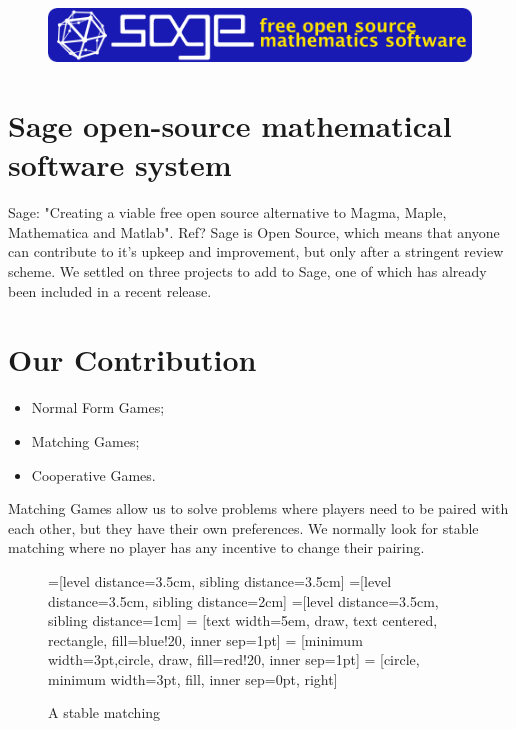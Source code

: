 \documentclass[a0,landscape]{a0poster}
\begin{document}
\vspace{1cm}
\begin{multicols}{3}


\begin{figure}[H]
\centering
\includegraphics[width=0.9\linewidth]{Images/sage-banner-02.png}
\end{figure}

\color{Brown}
\section*{Sage open-source mathematical software system}
Sage: "Creating a viable free open source alternative to Magma, Maple, Mathematica and Matlab".
Ref?
Sage is Open Source, which means that anyone can contribute to it's upkeep and improvement, but only after a stringent review scheme.
We settled on three projects to add to Sage, one of which has already been included in a recent release.

\section*{Our Contribution}
\begin{itemize}
    \item Normal Form Games;
    \item Matching Games;
    \item Cooperative Games.
\end{itemize}

Matching Games allow us to solve problems where players need to be paired with each other, but they have their own preferences.
We normally look for stable matching where no player has any incentive to change their pairing.

\begin{figure}[H]
\color{Black}
\centering
{}=[level distance=3.5cm, sibling distance=3.5cm]
=[level distance=3.5cm, sibling distance=2cm]
=[level distance=3.5cm, sibling distance=1cm]
 = [text width=5em, draw, text centered, rectangle, fill=blue!20, inner sep=1pt]
 = [minimum width=3pt,circle,  draw, fill=red!20, inner sep=1pt]
 = [circle, minimum width=3pt, fill, inner sep=0pt, right]
\caption{A stable matching}
\label{fig:matching_game}
\end{figure}


\end{multicols}
\end{document}
